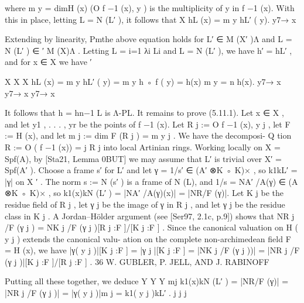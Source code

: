 \documentclass[
  10pt,
]{article}
\newenvironment{Shaded}{}{}
\newcommand{\NormalTok}[1]{#1}
\begin{document}
\begin{Shaded}
\begin{Highlighting}[]
\NormalTok{where m y = dimH (x) (O f −1 (x), y ) is the multiplicity of y in f −1 (x). With this in place, letting}
\NormalTok{L = N (L′ ), it follows that}
\NormalTok{                                                  X}
\NormalTok{                                         hL (x) =     m y hL′ ( y).}
\NormalTok{                                                             y7→ x}

\NormalTok{Extending by linearity,}
\NormalTok{                     Pmthe above      equation holds for L′ ∈ M (X′ )Λ and L = N (L′ ) ∈}
\NormalTok{                   ′}
\NormalTok{M (X)Λ . Letting L = i=1 λi Li and L = N (L′ ), we have h′ = hL′ , and for x ∈ X we have}
\NormalTok{                               ′}

\NormalTok{                     X                 X                         X}
\NormalTok{            hL (x) =    m y hL′ ( y) =     m y h ◦ f ( y) = h(x)   m y = n h(x).}
\NormalTok{                          y7→ x                      y7→ x                                 y7→ x}

\NormalTok{It follows that h = hn−1 L is Λ{-}PL.}
\NormalTok{   It remains to prove (5.11.1). Let x ∈ X , and let y1 , . . . , yr be the points of f −1 (x). Let}
\NormalTok{R j := O f −1 (x), y j , let F := H (x), and let m j := dim F (R j ) = m y j . We have the decomposi{-}}
\NormalTok{                                 Q}
\NormalTok{tion R := O ( f −1 (x)) =          j R j into local Artinian rings. Working locally on X = Spf(A),}
\NormalTok{by [Sta21, Lemma 0BUT] we may assume that L′ is trivial over X′ = Spf(A′ ). Choose a}
\NormalTok{frame s′ for L′ and let γ = 1/s′ ∈ (A′ ⊗K ◦ K)× , so k1kL′ = |γ| on X ′ . The norm s := N (s′ )}
\NormalTok{is a frame of N (L), and 1/s = NA′ /A(γ) ∈ (A ⊗K ◦ K)× , so}
\NormalTok{                                  k1(x)kN (L′ ) = |NA′ /A(γ)(x)| = |NR/F (γ)|.}
\NormalTok{Let K j be the residue field of R j , let γ j be the image of γ in R j , and let γ j be the residue}
\NormalTok{class in K j . A Jordan–Hölder argument (see [Ser97, 2.1c, p.9]) shows that NR j /F (γ j ) =}
\NormalTok{NK j /F (γ j )[R j :F ]/[K j :F ] . Since the canonical valuation on H ( y j ) extends the canonical valu{-}}
\NormalTok{ation on the complete non{-}archimedean field F = H (x), we have}
\NormalTok{                 |γ( y j )|[K j :F ] = |γ j |[K j :F ] = |NK j /F (γ j ))| = |NR j /F (γ j )|[K j :F ]/[R j :F ] .}
\NormalTok{36                               W. GUBLER, P. JELL, AND J. RABINOFF}

\NormalTok{Putting all these together, we deduce}
\NormalTok{                                     Y                    Y                 Y           mj}
\NormalTok{        k1(x)kN (L′ ) = |NR/F (γ)| =   |NR j /F (γ j )| =   |γ( y j )|m j =   k1( y j )kL′ .}
\NormalTok{                                        j                   j                j}


\end{Highlighting}
\end{Shaded}
\end{document}
